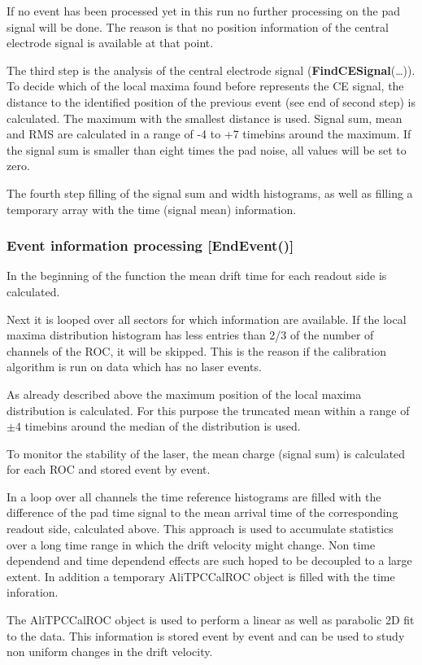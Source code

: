 If no event has been processed yet in this run no further processing on the pad signal will be done. The reason is that no position information of the central electrode signal is available at that point.

The third step is the analysis of the central electrode signal ({\bf FindCESignal}(\dots)). To decide which of the local maxima found before represents the CE signal, the distance to the identified position of the previous event (see end of second step) is calculated. The maximum with the smallest distance is used. Signal sum, mean and RMS are calculated in a range of -4 to +7 timebins around the maximum. If the signal sum is smaller than eight times the pad noise, all values will be set to zero.

The fourth step filling of the signal sum and width histograms, as well as filling a temporary array with the time (signal mean) information.

\subsubsection{Event information processing {\small [EndEvent()]}}
In the beginning of the function the mean drift time for each readout side is calculated.

Next it is looped over all sectors for which information are available. If the local maxima distribution histogram has less entries than 2/3 of the number of channels of the ROC, it will be skipped. This is the reason if the calibration algorithm is run on data which has no laser events.

As already described above the maximum position of the local maxima distribution is calculated. For this purpose the truncated mean within a range of $\pm4$ timebins around the median of the distribution is used.

To monitor the stability of the laser, the mean charge (signal sum) is calculated for each ROC and stored event by event.

In a loop over all channels the time reference histograms are filled with the difference of the pad time  signal to the mean arrival time of the corresponding readout side, calculated above. This approach is used to accumulate statistics over a long time range in which the drift velocity might change. Non time dependend and time dependend effects are such hoped to be decoupled to a large extent. In addition a temporary AliTPCCalROC object is filled with the time inforation.

The AliTPCCalROC object is used to perform a linear as well as parabolic 2D fit to the data. This information is stored event by event and can be used to study non uniform changes in the drift velocity.

